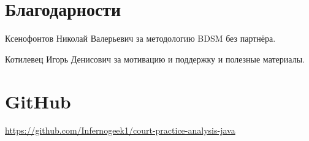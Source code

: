 \documentclass[a4paper,12pt]{extarticle}
\begin{document}
\section{Благодарности}
\begin{description}
    \item Ксенофонтов Николай Валерьевич за методологию BDSM без партнёра.
    \item Котилевец Игорь Денисович за мотивацию и поддержку и полезные
        материалы.
        \end{description}
\section{GitHub}
\url{https://github.com/Infernogeek1/court-practice-analysis-java}
        \printbibliography[heading=bibintoc, title={\centering{Список использованных источников}}]
\end{document}

